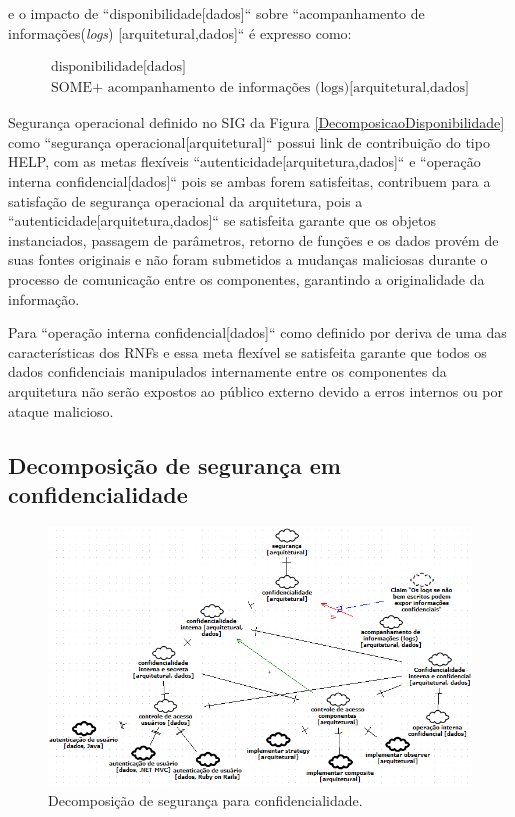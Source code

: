 e o impacto de ``disponibilidade[dados]`` sobre ``acompanhamento de informações(\textit{logs}) [arquitetural,dados]`` é expresso como:


\begin{eqnarray}
\label{eq:disponibilidadeImpacto}
\textrm{disponibilidade[dados]}  \nonumber\\
\textrm{SOME+ acompanhamento de informações (logs)[arquitetural,dados]} 
\end{eqnarray}

Segurança operacional definido no SIG da Figura \ref{DecomposicaoDisponibilidade} como ``segurança operacional[arquitetural]`` possui link de contribuição do tipo HELP, com as metas flexíveis ``autenticidade[arquitetura,dados]`` e ``operação interna confidencial[dados]`` pois se ambas forem satisfeitas, contribuem para a satisfação de segurança operacional da arquitetura, pois a ``autenticidade[arquitetura,dados]`` se satisfeita garante que os objetos instanciados, passagem de parâmetros, retorno de funções e os dados provém de suas fontes originais e não foram submetidos a mudanças maliciosas durante o processo de comunicação entre os componentes, garantindo a originalidade da informação.

Para ``operação interna confidencial[dados]`` como definido por \cite{chung2012non} deriva de uma das características dos RNFs e essa meta flexível se satisfeita garante que todos os dados confidenciais manipulados internamente entre os componentes da arquitetura não serão expostos ao público externo devido a erros internos ou por ataque malicioso. 

\pagebreak

\subsection{Decomposição de segurança em confidencialidade}

\begin{figure}[h!]
	\centering
	\includegraphics[keepaspectratio=true,scale=0.9]{figuras/SIG-Confidencialidade.PNG}
	\caption{Decomposição de segurança para confidencialidade.}
	\label{DecomposicaoConfidencialidade}
\end{figure}

